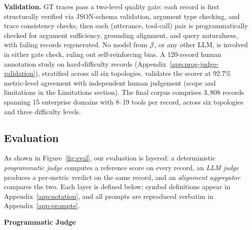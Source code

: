 \noindent\textbf{Validation.} GT traces pass a two-level quality gate: each record is first structurally verified via JSON-schema validation, argument type checking, and trace consistency checks, then each (utterance, tool-call) pair is programmatically checked for argument sufficiency, grounding alignment, and query naturalness, with failing records regenerated. No model from $\mathcal{J}$, or any other LLM, is involved in either gate check, ruling out self-reinforcing bias. A 120-record human annotation study on hard-difficulty records (Appendix~\ref{app:prog-judge-validation}), stratified across all six topologies, validates the scorer at $92.7\%$ metric-level agreement with independent human judgement (scope and limitations in the Limitations section). The final corpus comprises $3{,}808$ records spanning 15 enterprise domains with 8--19 tools per record, across six topologies and three difficulty levels.

\vspace{-0.4cm}
\subsection{Evaluation}
\label{sec:methodology:eval}
\vspace{-0.3cm}
As shown in Figure~\ref{fig:eval}, our evaluation is layered: a deterministic \emph{programmatic judge} computes a reference score on every record, an \emph{LLM judge} produces a per-metric verdict on the same record, and an \emph{alignment aggregator} compares the two. Each layer is defined below; symbol definitions appear in Appendix~\ref{app:notation}, and all prompts are reproduced verbatim in Appendix~\ref{app:prompts}.

\noindent\textbf{Programmatic Judge}
\label{sec:methodology:programmatic}

